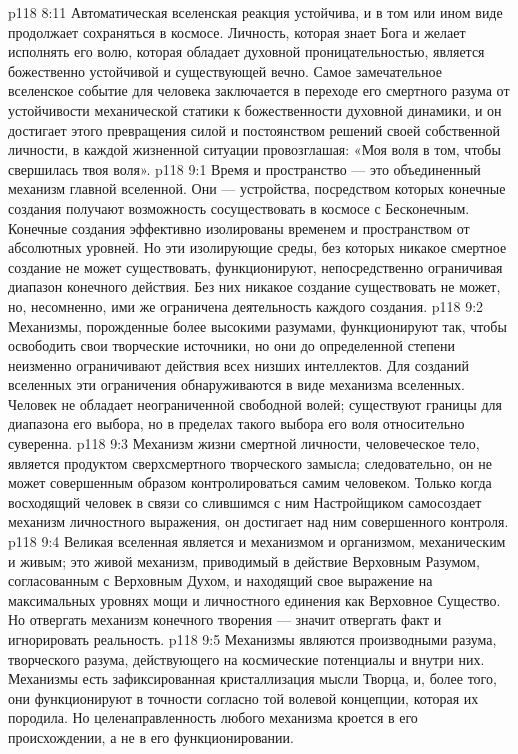 \vs p118 8:11 Автоматическая вселенская реакция устойчива, и в том или ином виде продолжает сохраняться в космосе. Личность, которая знает Бога и желает исполнять его волю, которая обладает духовной проницательностью, является божественно устойчивой и существующей вечно. Самое замечательное вселенское событие для человека заключается в переходе его смертного разума от устойчивости механической статики к божественности духовной динамики, и он достигает этого превращения силой и постоянством решений своей собственной личности, в каждой жизненной ситуации провозглашая: «Моя воля в том, чтобы свершилась твоя воля».
\vs p118 9:1 Время и пространство --- это объединенный механизм главной вселенной. Они --- устройства, посредством которых конечные создания получают возможность сосуществовать в космосе с Бесконечным. Конечные создания эффективно изолированы временем и пространством от абсолютных уровней. Но эти изолирующие среды, без которых никакое смертное создание не может существовать, функционируют, непосредственно ограничивая диапазон конечного действия. Без них никакое создание существовать не может, но, несомненно, ими же ограничена деятельность каждого создания.
\vs p118 9:2 Механизмы, порожденные более высокими разумами, функционируют так, чтобы освободить свои творческие источники, но они до определенной степени неизменно ограничивают действия всех низших интеллектов. Для созданий вселенных эти ограничения обнаруживаются в виде механизма вселенных. Человек не обладает неограниченной свободной волей; существуют границы для диапазона его выбора, но в пределах такого выбора его воля относительно суверенна.
\vs p118 9:3 Механизм жизни смертной личности, человеческое тело, является продуктом сверхсмертного творческого замысла; следовательно, он не может совершенным образом контролироваться самим человеком. Только когда восходящий человек в связи со слившимся с ним Настройщиком самосоздает механизм личностного выражения, он достигает над ним совершенного контроля.
\vs p118 9:4 Великая вселенная является и механизмом и организмом, механическим и живым; это живой механизм, приводимый в действие Верховным Разумом, согласованным с Верховным Духом, и находящий свое выражение на максимальных уровнях мощи и личностного единения как Верховное Существо. Но отвергать механизм конечного творения --- значит отвергать факт и игнорировать реальность.
\vs p118 9:5 Механизмы являются производными разума, творческого разума, действующего на космические потенциалы и внутри них. Механизмы есть зафиксированная кристаллизация мысли Творца, и, более того, они функционируют в точности согласно той волевой концепции, которая их породила. Но целенаправленность любого механизма кроется в его происхождении, а не в его функционировании.
